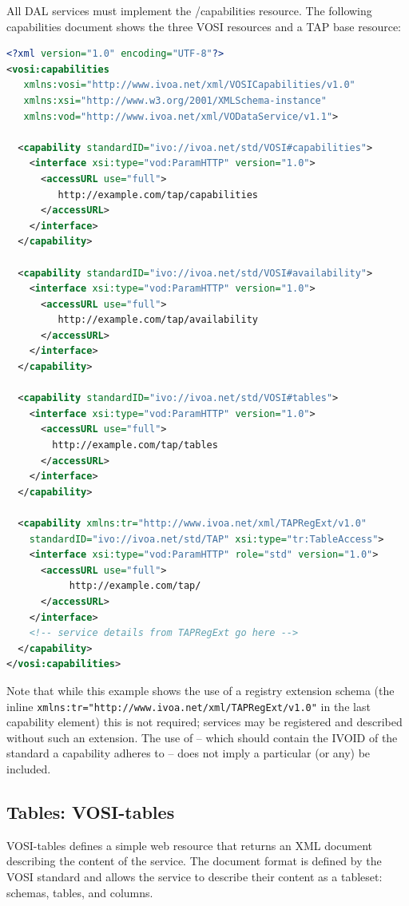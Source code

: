 \documentclass[11pt,letter]{ivoa}
\begin{document}
All DAL services must implement the /capabilities resource. The following 
capabilities document shows the three VOSI resources and a TAP base resource: 

\begin{lstlisting}[language=XML,basicstyle=\footnotesize]
<?xml version="1.0" encoding="UTF-8"?>
<vosi:capabilities
   xmlns:vosi="http://www.ivoa.net/xml/VOSICapabilities/v1.0"
   xmlns:xsi="http://www.w3.org/2001/XMLSchema-instance"
   xmlns:vod="http://www.ivoa.net/xml/VODataService/v1.1">

  <capability standardID="ivo://ivoa.net/std/VOSI#capabilities">
    <interface xsi:type="vod:ParamHTTP" version="1.0">
      <accessURL use="full">
         http://example.com/tap/capabilities
      </accessURL>
    </interface>
  </capability>

  <capability standardID="ivo://ivoa.net/std/VOSI#availability">
    <interface xsi:type="vod:ParamHTTP" version="1.0">
      <accessURL use="full">
         http://example.com/tap/availability
      </accessURL>
    </interface>
  </capability>

  <capability standardID="ivo://ivoa.net/std/VOSI#tables">
    <interface xsi:type="vod:ParamHTTP" version="1.0">
      <accessURL use="full">
        http://example.com/tap/tables
      </accessURL>
    </interface>
  </capability>

  <capability xmlns:tr="http://www.ivoa.net/xml/TAPRegExt/v1.0"
    standardID="ivo://ivoa.net/std/TAP" xsi:type="tr:TableAccess">
    <interface xsi:type="vod:ParamHTTP" role="std" version="1.0">
      <accessURL use="full">
           http://example.com/tap/
      </accessURL>
    </interface>
    <!-- service details from TAPRegExt go here -->
  </capability>
</vosi:capabilities>
\end{lstlisting}

Note that while this example shows the use of a registry extension schema (the 
inline \verb|xmlns:tr="http://www.ivoa.net/xml/TAPRegExt/v1.0"| in the last capability 
element) this is not required; services may be registered and described without 
such an extension. The use of  -- which should contain the
IVOID of 
the standard a capability adheres to -- does not imply a particular (or any) 
 be included.

\subsection{Tables: VOSI-tables}
\label{sec:vosi-tables}
VOSI-tables \citep{std:VOSI} defines a simple web resource that returns an 
XML document 
describing the content of the service. The document format is defined by the 
VOSI \citep{std:VOSI} standard and allows the service to 
describe their content 
as a tableset: schemas, tables, and columns.
\end{document}
